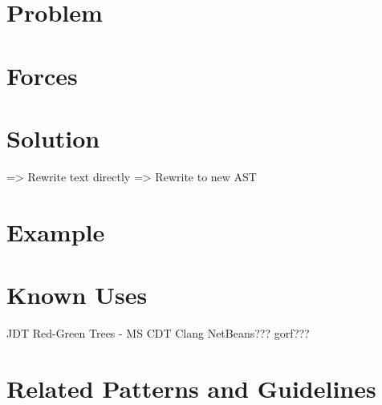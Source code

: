\documentclass[prodmode]{acmlarge}
\begin{document}
\cite{TODO}

\section{Problem}

\section{Forces}

\section{Solution}
=> Rewrite text directly
=> Rewrite to new AST

\section{Example}

\section{Known Uses}
JDT
Red-Green Trees - MS
CDT
Clang
NetBeans???
gorf???

\section{Related Patterns and Guidelines}




\end{document}

